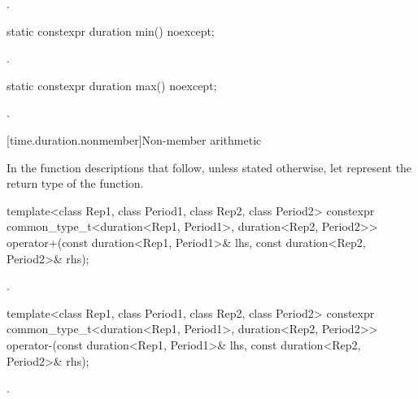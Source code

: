 \begin{itemdescr}
\pnum
\returns
{}.
\end{itemdescr}

%
\begin{itemdecl}
static constexpr duration min() noexcept;
\end{itemdecl}

\begin{itemdescr}
\pnum
\returns
{}.
\end{itemdescr}

%
\begin{itemdecl}
static constexpr duration max() noexcept;
\end{itemdecl}

\begin{itemdescr}
\pnum
\returns
{}.
\end{itemdescr}

[time.duration.nonmember]{Non-member arithmetic}

\pnum
In the function descriptions that follow, unless stated otherwise,
let  represent the return type of the function.

%
\begin{itemdecl}
template<class Rep1, class Period1, class Rep2, class Period2>
  constexpr common_type_t<duration<Rep1, Period1>, duration<Rep2, Period2>>
    operator+(const duration<Rep1, Period1>& lhs, const duration<Rep2, Period2>& rhs);
\end{itemdecl}

\begin{itemdescr}
\pnum
\returns
{}.
\end{itemdescr}

%
\begin{itemdecl}
template<class Rep1, class Period1, class Rep2, class Period2>
  constexpr common_type_t<duration<Rep1, Period1>, duration<Rep2, Period2>>
  operator-(const duration<Rep1, Period1>& lhs, const duration<Rep2, Period2>& rhs);
\end{itemdecl}

\begin{itemdescr}
\pnum
\returns
{}.
\end{itemdescr}

